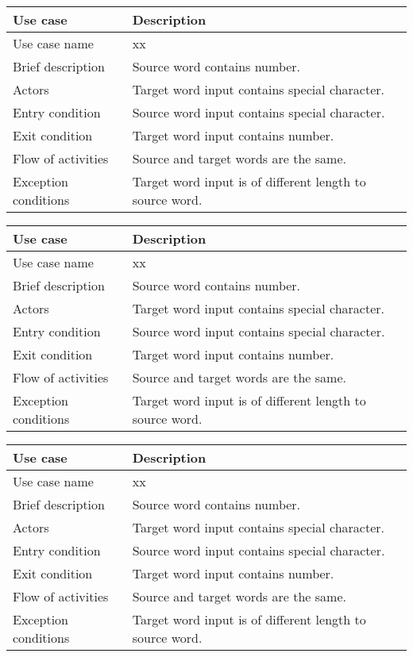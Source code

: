 \documentclass[12pt, a4]{report}
\begin{document}
	\begin{table}[ht]
	\begin{tabular}{|p{4cm}|p{12cm}|}
		\hline
		Use case & Description \\
		\hline
		Use case name & xx \\
		Brief description & Source word contains number. \\
		Actors & Target word input contains special character. \\
		Entry condition & Source word input contains special character. \\
		Exit condition & Target word input contains number. \\
		Flow of activities & Source and target words are the same.\\
		Exception conditions & Target word input is of different length to source word.\\
		\hline
	\end{tabular}
	\end{table}

	\begin{table}[ht]
	\begin{tabular}{|p{4cm}|p{12cm}|}
		\hline
		Use case & Description \\
		\hline
		Use case name & xx \\
		Brief description & Source word contains number. \\
		Actors & Target word input contains special character. \\
		Entry condition & Source word input contains special character. \\
		Exit condition & Target word input contains number. \\
		Flow of activities & Source and target words are the same.\\
		Exception conditions & Target word input is of different length to source word.\\
		\hline
	\end{tabular}
	\end{table}

	\pagebreak

	\begin{table}[ht]
	\begin{tabular}{|p{4cm}|p{12cm}|}
		\hline
		Use case & Description \\
		\hline
		Use case name & xx \\
		Brief description & Source word contains number. \\
		Actors & Target word input contains special character. \\
		Entry condition & Source word input contains special character. \\
		Exit condition & Target word input contains number. \\
		Flow of activities & Source and target words are the same.\\
		Exception conditions & Target word input is of different length to source word.\\
		\hline
	\end{tabular}
	\end{table}
\end{document}
